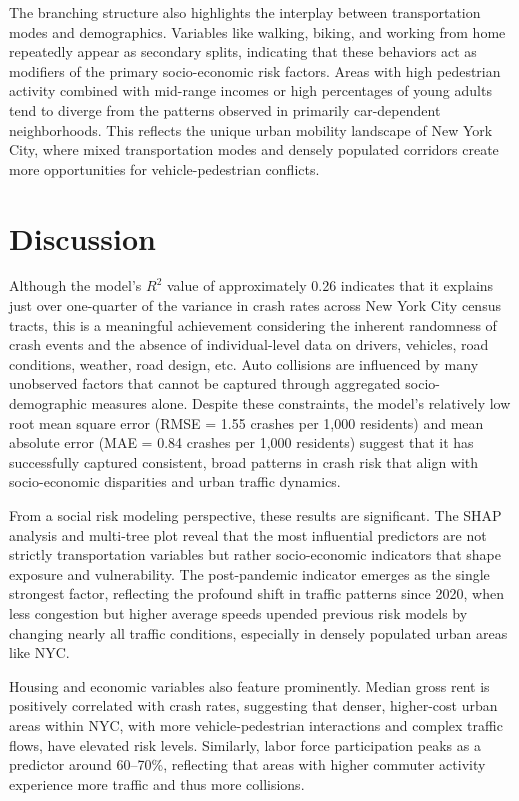 \documentclass[
  number,
  review,
  3p]{elsarticle}
\begin{document}
The branching structure also highlights the interplay between
transportation modes and demographics. Variables like walking, biking,
and working from home repeatedly appear as secondary splits, indicating
that these behaviors act as modifiers of the primary socio-economic risk
factors. Areas with high pedestrian activity combined with mid-range
incomes or high percentages of young adults tend to diverge from the
patterns observed in primarily car-dependent neighborhoods. This
reflects the unique urban mobility landscape of New York City, where
mixed transportation modes and densely populated corridors create more
opportunities for vehicle-pedestrian conflicts.

\section{Discussion}\label{discussion}

Although the model's \(R^2\) value of approximately 0.26 indicates that
it explains just over one-quarter of the variance in crash rates across
New York City census tracts, this is a meaningful achievement
considering the inherent randomness of crash events and the absence of
individual-level data on drivers, vehicles, road conditions, weather,
road design, etc. Auto collisions are influenced by many unobserved
factors that cannot be captured through aggregated socio-demographic
measures alone. Despite these constraints, the model's relatively low
root mean square error (RMSE = 1.55 crashes per 1,000 residents) and
mean absolute error (MAE = 0.84 crashes per 1,000 residents) suggest
that it has successfully captured consistent, broad patterns in crash
risk that align with socio-economic disparities and urban traffic
dynamics.

From a social risk modeling perspective, these results are significant.
The SHAP analysis and multi-tree plot reveal that the most influential
predictors are not strictly transportation variables but rather
socio-economic indicators that shape exposure and vulnerability. The
post-pandemic indicator emerges as the single strongest factor,
reflecting the profound shift in traffic patterns since 2020, when less
congestion but higher average speeds upended previous risk models by
changing nearly all traffic conditions, especially in densely populated
urban areas like NYC.

Housing and economic variables also feature prominently. Median gross
rent is positively correlated with crash rates, suggesting that denser,
higher-cost urban areas within NYC, with more vehicle-pedestrian
interactions and complex traffic flows, have elevated risk levels.
Similarly, labor force participation peaks as a predictor around
60--70\%, reflecting that areas with higher commuter activity experience
more traffic and thus more collisions.
\end{document}
